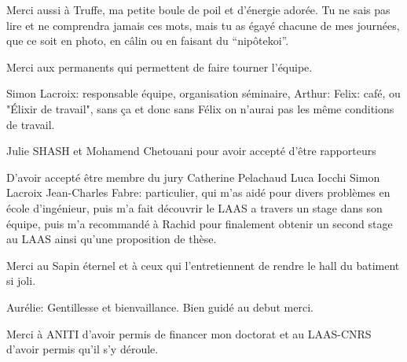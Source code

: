 
Merci aussi à Truffe, ma petite boule de poil et d'énergie adorée. Tu ne sais pas lire et ne comprendra jamais ces mots, mais tu as égayé chacune de mes journées, que ce soit en photo, en câlin ou en faisant du ``nipôtekoi''.



Merci aux permanents qui permettent de faire tourner l'équipe.   

Simon Lacroix: responsable équipe, organisation séminaire, 
Arthur: 
Felix: café, ou "Élixir de travail", sans ça et donc sans Félix on n'aurai pas les même conditions de travail. 



Julie SHASH et Mohamend Chetouani pour avoir accepté d'être rapporteurs

D'avoir accepté être membre du jury
Catherine Pelachaud
Luca Iocchi 
Simon Lacroix
Jean-Charles Fabre: particulier, qui m'as aidé pour divers problèmes en école d'ingénieur, puis m'a fait découvrir le LAAS a travers un stage dans son équipe, puis m'a recommandé à Rachid pour finalement obtenir un second stage au LAAS ainsi qu'une proposition de thèse. 



Merci au Sapin éternel et à ceux qui l'entretiennent de rendre le hall du batiment si joli.

Aurélie: Gentillesse et bienvaillance. Bien guidé au debut merci. 



Merci à ANITI d'avoir permis de financer mon doctorat et au LAAS-CNRS d'avoir permis qu'il s'y déroule.

